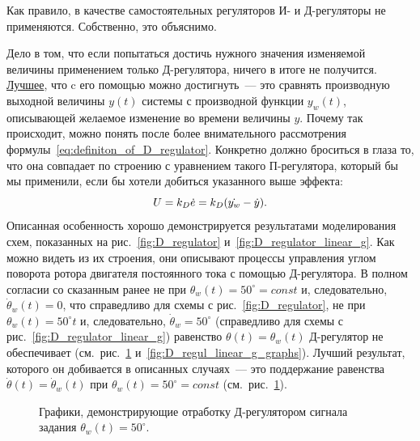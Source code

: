 \documentclass[12pt,a4paper,openany]{extarticle}
\begin{document}
Как правило, в качестве самостоятельных регуляторов И- и Д-регуляторы не применяются.
Собственно, это объяснимо.

Дело в том, что если попытаться достичь нужного значения изменяемой величины применением только Д-регулятора, ничего в итоге не получится.
\underline{Лучшее}, что c его помощью можно достигнуть~--- это сравнять производную выходной величины $y(t)$ системы с производной функции $y_w(t)$, описывающей желаемое изменение во времени величины $y$.
Почему так происходит, можно понять после более внимательного рассмотрения формулы~\eqref{eq:definiton_of_D_regulator}.
Конкретно должно броситься в глаза то, что она совпадает по строению с уравнением такого П-регулятора, который бы мы применили, если бы хотели добиться указанного выше эффекта:
\begin{equation}
U = k_D\dot{e} = k_D(\dot{y_w} - \dot{y})\ldotp
\end{equation}
Описанная особенность хорошо демонстрируется результатами моделирования схем, показанных на рис.~\ref{fig:D_regulator} и~\ref{fig:D_regulator_linear_g}.
Как можно видеть из их строения, они описывают процессы управления углом поворота ротора двигателя постоянного тока с помощью Д-регулятора.
В полном согласии со сказанным ранее не при $\theta_w(t)=50^\circ=const$ и, следовательно, $\dot{\theta}_w(t) = 0$, что справедливо для схемы с рис.~\ref{fig:D_regulator}, не при $\theta_w(t) = 50^\circ t$ и, следовательно, $\dot{\theta}_w = 50^\circ$ (справедливо для схемы с рис.~\ref{fig:D_regulator_linear_g}) равенство $\theta(t)=\theta_w(t)$ Д-регулятор не обеспечивает (см.~рис.~\ref{fig:D_regul_const_g} и~\ref{fig:D_regul_linear_g_graphs}).
Лучший результат, которого он добивается в описанных случаях~--- это поддержание равенства $\dot\theta(t)=\dot\theta_w(t)$ при $\theta_w(t)=50^\circ=const$ (см.~рис.~\ref{fig:D_regul_const_g}).

\begin{figure}[h!]
	\vspace{-0.5cm}
	\caption{Графики, демонстрирующие отработку Д-регулятором сигнала задания $\theta_w(t) = 50^\circ$.}
	\label{fig:D_regul_const_g}
\end{figure}	
	
\end{document}
